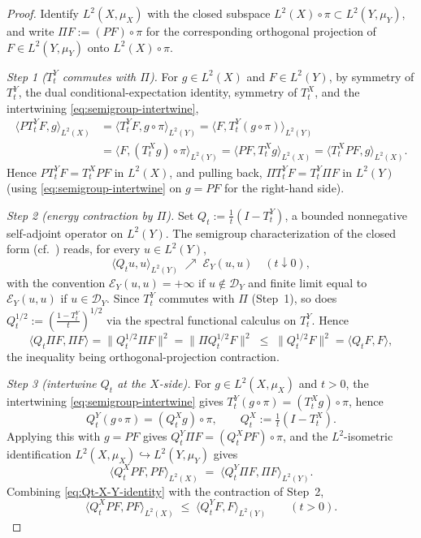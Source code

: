 \documentclass[11pt,reqno]{amsart}
\theoremstyle{plain}
\theoremstyle{definition}
\theoremstyle{remark}
\newcommand{\cD}{\mathcal D}
\newcommand{\cE}{\mathcal E}
\begin{document}
\begin{proof}
Identify $L^{2}(X,\mu_{X})$ with the closed subspace
$L^{2}(X)\circ\pi\subset L^{2}(Y,\mu_{Y})$, and write
$\Pi F:=(PF)\circ\pi$ for the corresponding orthogonal projection
of $F\in L^{2}(Y,\mu_{Y})$ onto $L^{2}(X)\circ\pi$.

\emph{Step 1 ($T_{t}^{Y}$ commutes with $\Pi$).}
For $g\in L^{2}(X)$ and $F\in L^{2}(Y)$, by symmetry of
$T_{t}^{Y}$, the dual conditional-expectation identity, symmetry
of $T_{t}^{X}$, and the intertwining \cref{eq:semigroup-intertwine},
\begin{align*}
  \langle PT_{t}^{Y}F,g\rangle_{L^{2}(X)}
  &=\langle T_{t}^{Y}F,g\circ\pi\rangle_{L^{2}(Y)}
   =\langle F,T_{t}^{Y}(g\circ\pi)\rangle_{L^{2}(Y)}\\
  &=\langle F,(T_{t}^{X}g)\circ\pi\rangle_{L^{2}(Y)}
   =\langle PF,T_{t}^{X}g\rangle_{L^{2}(X)}
   =\langle T_{t}^{X}PF,g\rangle_{L^{2}(X)}.
\end{align*}
Hence $PT_{t}^{Y}F=T_{t}^{X}PF$ in $L^{2}(X)$, and pulling back,
$\Pi T_{t}^{Y}F=T_{t}^{Y}\Pi F$ in $L^{2}(Y)$ (using
\cref{eq:semigroup-intertwine} on $g=PF$ for the right-hand side).

\emph{Step 2 (energy contraction by $\Pi$).}
Set $Q_{t}:=\tfrac{1}{t}(I-T_{t}^{Y})$, a bounded nonnegative
self-adjoint operator on $L^{2}(Y)$. The semigroup
characterization of the closed form
(cf.~\cite[Lem.~1.3.4]{FOT}) reads, for every $u\in L^{2}(Y)$,
\begin{equation}\label{eq:sg-char}
  \langle Q_{t}u,u\rangle_{L^{2}(Y)}
  \;\nearrow\;\cE_{Y}(u,u)\quad(t\downarrow 0),
\end{equation}
with the convention $\cE_{Y}(u,u)=+\infty$ if $u\notin\cD_{Y}$ and
finite limit equal to $\cE_{Y}(u,u)$ if $u\in\cD_{Y}$. Since
$T_{t}^{Y}$ commutes with $\Pi$ (Step~1), so does
$Q_{t}^{1/2}:=(\tfrac{1-T_{t}^{Y}}{t})^{1/2}$ via the spectral
functional calculus on $T_{t}^{Y}$. Hence
\[
  \langle Q_{t}\Pi F,\Pi F\rangle
  =\|Q_{t}^{1/2}\Pi F\|^{2}
  =\|\Pi Q_{t}^{1/2}F\|^{2}
  \;\le\;\|Q_{t}^{1/2}F\|^{2}
  =\langle Q_{t}F,F\rangle,
\]
the inequality being orthogonal-projection contraction.

\emph{Step 3 (intertwine $Q_{t}$ at the $X$-side).}
For $g\in L^{2}(X,\mu_{X})$ and $t>0$, the intertwining
\cref{eq:semigroup-intertwine} gives
$T_{t}^{Y}(g\circ\pi)=(T_{t}^{X}g)\circ\pi$, hence
\[
  Q_{t}^{Y}(g\circ\pi)=(Q_{t}^{X}g)\circ\pi,
  \qquad Q_{t}^{X}:=\tfrac{1}{t}(I-T_{t}^{X}).
\]
Applying this with $g=PF$ gives $Q_{t}^{Y}\Pi F=(Q_{t}^{X}PF)\circ\pi$,
and the $L^{2}$-isometric identification
$L^{2}(X,\mu_{X})\hookrightarrow L^{2}(Y,\mu_{Y})$ gives
\begin{equation}\label{eq:Qt-X-Y-identity}
  \langle Q_{t}^{X}PF,PF\rangle_{L^{2}(X)}
  \;=\;\langle Q_{t}^{Y}\Pi F,\Pi F\rangle_{L^{2}(Y)}.
\end{equation}
Combining \cref{eq:Qt-X-Y-identity} with the contraction of
Step~2,
\begin{equation}\label{eq:Qt-X-bound}
  \langle Q_{t}^{X}PF,PF\rangle_{L^{2}(X)}
  \;\le\;\langle Q_{t}^{Y}F,F\rangle_{L^{2}(Y)}
  \qquad(t>0).
\end{equation}


\end{proof}
\end{document}
